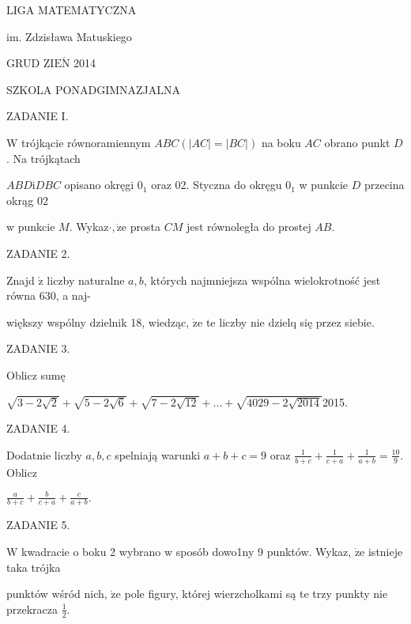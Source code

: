 \documentclass[a4paper,12pt]{article}
\begin{document}
LIGA MATEMATYCZNA

im. Zdzisława Matuskiego

GRUD Z$\mathrm{I}\mathrm{E}\acute{\mathrm{N}}$ 2014

SZKOLA PONADGIMNAZJALNA

ZADANIE I.

$\mathrm{W}$ trójkącie równoramiennym $ABC(|AC|=|BC|)$ na boku $AC$ obrano punkt $D$. Na trójkątach

$ABD\mathrm{i}DBC$ opisano okręgi $0_{1}$ oraz 02. Styczna do okręgu $0_{1}$ w punkcie $D$ przecina okrąg 02

w punkcie $M$. Wykaz$\cdot, \dot{\mathrm{z}}\mathrm{e}$ prosta $CM$ jest równoległa do prostej $AB.$

ZADANIE 2.

Znajd $\acute{\mathrm{z}}$ liczby naturalne $a, b$, których najmniejsza wspólna wielokrotność jest równa 630, a naj-

większy wspólny dzielnik 18, wiedząc, $\dot{\mathrm{z}}\mathrm{e}$ te liczby nie dzielq się przez siebie.

ZADANIE 3.

Oblicz sumę

$\sqrt{3-2\sqrt{2}}+\sqrt{5-2\sqrt{6}}+\sqrt{7-2\sqrt{12}}+\ldots+\sqrt{4029-2\sqrt{2014}}$2015.

ZADANIE 4.

Dodatnie liczby $a, b, c$ spelniają warunki $a+b+c=9$ oraz $\displaystyle \frac{1}{b+c}+\frac{1}{c+a}+\frac{1}{a+b}=\frac{10}{9}$. Oblicz

$\displaystyle \frac{a}{b+c}+\frac{b}{c+a}+\frac{c}{a+b}.$

ZADANIE 5.

$\mathrm{W}$ kwadracie o boku 2 wybrano w sposób dowo1ny 9 punktów. Wykaz, $\dot{\mathrm{z}}\mathrm{e}$ istnieje taka trójka

punktów wśród nich, $\dot{\mathrm{z}}\mathrm{e}$ pole figury, której wierzcholkami są te trzy punkty nie przekracza $\displaystyle \frac{1}{2}.$
\end{document}
